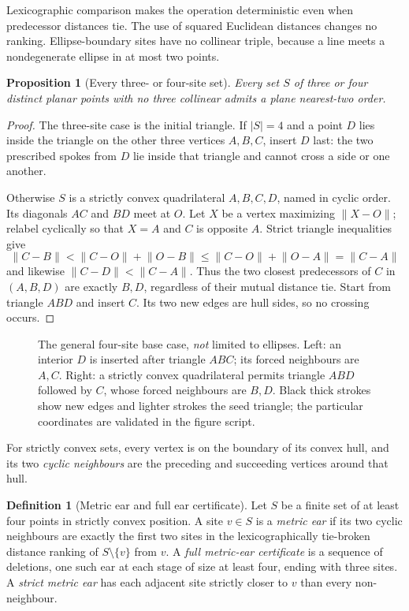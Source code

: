 \documentclass[11pt,a4paper]{article}
\newtheorem{proposition}[theorem]{Proposition}
\theoremstyle{definition}\newtheorem{definition}[theorem]{Definition}
\theoremstyle{remark}\newtheorem{remark}[theorem]{Remark}
\newcommand{\dist}[2]{\lVert #1-#2\rVert}
\begin{document}
Lexicographic comparison makes the operation deterministic even when predecessor distances tie. The use of squared Euclidean distances changes no ranking. Ellipse-boundary sites have no collinear triple, because a line meets a nondegenerate ellipse in at most two points.

\begin{proposition}[Every three- or four-site set]\label{prop:four}
Every set $S$ of three or four distinct planar points with no three collinear admits a plane nearest-two order.
\end{proposition}
\begin{proof}
The three-site case is the initial triangle. If $|S|=4$ and a point $D$ lies inside the triangle on the other three vertices $A,B,C$, insert $D$ last: the two prescribed spokes from $D$ lie inside that triangle and cannot cross a side or one another.

Otherwise $S$ is a strictly convex quadrilateral $A,B,C,D$, named in cyclic order. Its diagonals $AC$ and $BD$ meet at $O$. Let $X$ be a vertex maximizing $\dist{X}{O}$; relabel cyclically so that $X=A$ and $C$ is opposite $A$. Strict triangle inequalities give
\[
 \dist{C}{B}<\dist{C}{O}+\dist{O}{B}
 \le\dist{C}{O}+\dist{O}{A}=\dist{C}{A}
\]
and likewise $\dist{C}{D}<\dist{C}{A}$. Thus the two closest predecessors of $C$ in $(A,B,D)$ are exactly $B,D$, regardless of their mutual distance tie. Start from triangle $ABD$ and insert $C$. Its two new edges are hull sides, so no crossing occurs.
\end{proof}

\begin{figure}[ht]
\centering
\caption{The general four-site base case, \emph{not} limited to ellipses. Left: an interior $D$ is inserted after triangle $ABC$; its forced neighbours are $A,C$. Right: a strictly convex quadrilateral permits triangle $ABD$ followed by $C$, whose forced neighbours are $B,D$. Black thick strokes show new edges and lighter strokes the seed triangle; the particular coordinates are validated in the figure script.}\label{fig:four}
\end{figure}

For strictly convex sets, every vertex is on the boundary of its convex hull, and its two \emph{cyclic neighbours} are the preceding and succeeding vertices around that hull.

\begin{definition}[Metric ear and full ear certificate]\label{def:ear}
Let $S$ be a finite set of at least four points in strictly convex position. A site $v\in S$ is a \emph{metric ear} if its two cyclic neighbours are exactly the first two sites in the lexicographically tie-broken distance ranking of $S\setminus\{v\}$ from $v$. A \emph{full metric-ear certificate} is a sequence of deletions, one such ear at each stage of size at least four, ending with three sites. A \emph{strict metric ear} has each adjacent site strictly closer to $v$ than every non-neighbour.
\end{definition}
\end{document}
